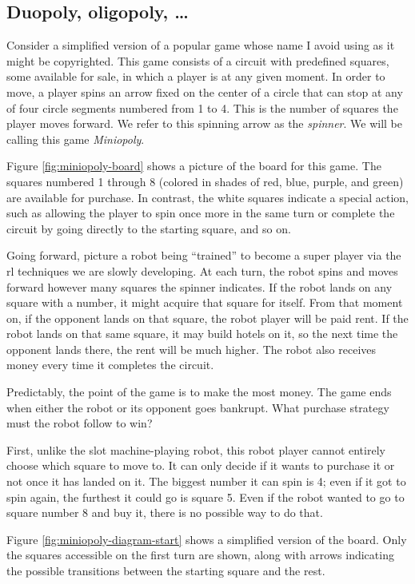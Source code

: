 \subsection{Duopoly, oligopoly, \ldots}

Consider a simplified version of a popular game whose name I avoid using as it
might be copyrighted. This game consists of a circuit with predefined squares,
some available for sale, in which a player is at any given moment. In order to
move, a player spins an arrow fixed on the center of a circle that can stop at
any of four circle segments numbered from 1 to 4. This is the number of squares
the player moves forward. We refer to this spinning arrow as the
\textit{spinner}. We will be calling this game \emph{Miniopoly}.

Figure \ref{fig:miniopoly-board} shows a picture of the board for this game. The
squares numbered 1 through 8 (colored in shades of red, blue, purple, and green)
are available for purchase. In contrast, the white squares indicate a special
action, such as allowing the player to spin once more in the same turn or
complete the circuit by going directly to the starting square, and so on.

Going forward, picture a robot being ``trained'' to become a super player via
the \ac{rl} techniques we are slowly developing. At each turn, the robot spins
and moves forward however many squares the spinner indicates. If the robot lands
on any square with a number, it might acquire that square for itself. From that
moment on, if the opponent lands on that square, the robot player will be paid
rent. If the robot lands on that same square, it may build hotels on it, so the
next time the opponent lands there, the rent will be much higher. The robot also
receives money every time it completes the circuit.

Predictably, the point of the game is to make the most money. The game ends when
either the robot or its opponent goes bankrupt. What purchase strategy must the
robot follow to win?

First, unlike the slot machine-playing robot, this robot player cannot entirely
choose which square to move to. It can only decide if it wants to purchase it or
not once it has landed on it. The biggest number it can spin is 4; even if it
got to spin again, the furthest it could go is square 5. Even if the robot
wanted to go to square number 8 and buy it, there is no possible way to do that.

Figure \ref{fig:miniopoly-diagram-start} shows a simplified version of the
board. Only the squares accessible on the first turn are shown, along with
arrows indicating the possible transitions between the starting square and the
rest.

